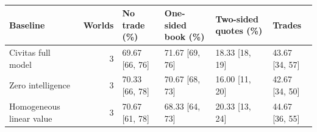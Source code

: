 \begin{table}[t]
\centering\small
\caption{}
\label{tab:rq1_results}
\begin{tabularx}{\textwidth}{@{}l r X X X X@{}}
\toprule
Baseline & Worlds & No trade (\%) & One-sided book (\%) & Two-sided quotes (\%) & Trades \\
\midrule
Civitas full model & 3 & 69.67 [66, 76] & 71.67 [69, 76] & 18.33 [18, 19] & 43.67 [34, 57] \\
Zero intelligence & 3 & 70.33 [66, 78] & 70.67 [68, 73] & 16.00 [11, 20] & 42.67 [34, 50] \\
Homogeneous linear value & 3 & 70.67 [61, 78] & 68.33 [64, 73] & 20.33 [13, 24] & 44.67 [36, 55] \\
\bottomrule
\end{tabularx}
\end{table}
